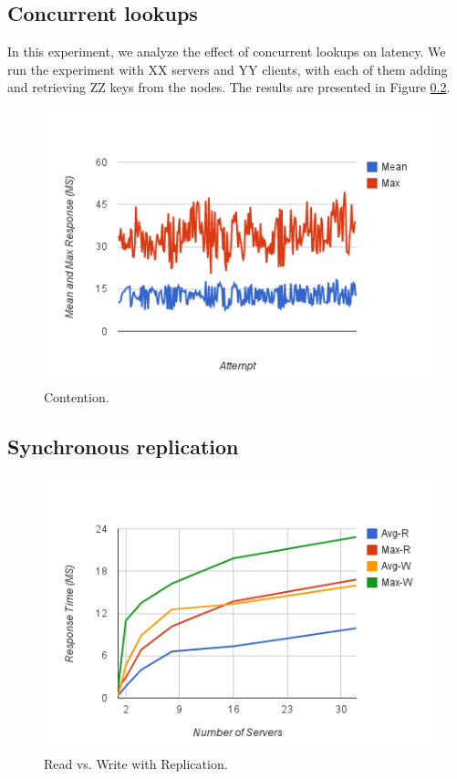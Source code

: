 \documentclass{sig-alternate-10pt}
\begin{document}
\subsection{Concurrent lookups}
In this experiment, we analyze the effect of concurrent lookups on latency. We run the experiment with XX servers and YY clients, with each of them adding and retrieving ZZ keys from the nodes. The results are presented in Figure \ref{}.

\begin{figure}[h]
\centering
\includegraphics[width=1\columnwidth]{./contention.png}
\caption{Contention.}
\label{fig:contention}
\end{figure}



\subsection{Synchronous replication}

\begin{figure}[h]
\centering
\includegraphics[width=1\columnwidth]{./response1.png}
\caption{Read vs. Write with Replication.}
\label{fig:read-write-rep}
\end{figure}
\end{document}
